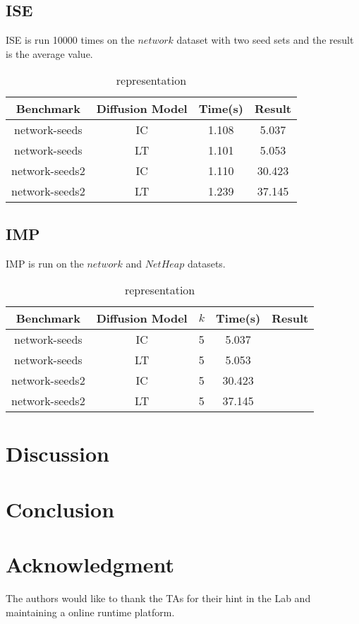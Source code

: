 \documentclass[conference]{IEEEtran}
\begin{document}
\subsection{ISE}
ISE is run 10000 times on the $network$ dataset with two seed sets and the result is the average value.
\begin{table}[H]
    \caption{representation}
    \centering
    \begin{tabular}{cccc}
    \toprule
    Benchmark&Diffusion Model&Time(s)&Result\\
    \midrule
    network-seeds&IC&1.108&5.037\\
    network-seeds&LT&1.101&5.053\\
    network-seeds2&IC&1.110&30.423\\
    network-seeds2&LT&1.239&37.145\\
    \bottomrule
    \end{tabular}
    \label{table:1}
    \end{table}

\subsection{IMP}
IMP is run on the $network$ and $NetHeap$ datasets.

\begin{table}[H]
    \caption{representation}
    \centering
    \begin{tabular}{ccccc}
    \toprule
    Benchmark&Diffusion Model&$k$&Time(s)&Result\\
    \midrule
    network-seeds&IC&5&5.037&\\
    network-seeds&LT&5&5.053&\\
    network-seeds2&IC&5&30.423&\\
    network-seeds2&LT&5&37.145&\\
    \bottomrule
    \end{tabular}
    \label{table:1}
    \end{table}
    \section{Discussion}


\section{Conclusion}

\section*{Acknowledgment}

The authors would like to thank the TAs for their hint in the Lab and maintaining a online runtime platform. 







\end{document}
